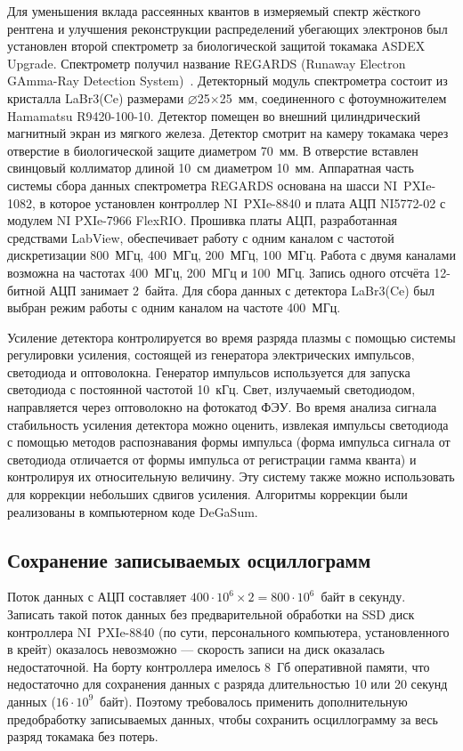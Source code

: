 Для уменьшения вклада рассеянных квантов в измеряемый спектр жёсткого рентгена и улучшения реконструкции распределений убегающих электронов был установлен второй спектрометр за биологической защитой токамака ASDEX Upgrade. Спектрометр получил название REGARDS (Runaway Electron GAmma-Ray Detection System)~\cite{DalMolin2019}. Детекторный модуль спектрометра состоит из кристалла LaBr3(Ce) размерами $\varnothing$25$\times$25~мм, соединенного с фотоумножителем Hamamatsu R9420-100-10. Детектор помещен во внешний цилиндрический магнитный экран из мягкого железа. Детектор смотрит на камеру токамака через отверстие в биологической защите диаметром 70~мм. В отверстие вставлен свинцовый коллиматор длиной 10~см диаметром 10~мм. Аппаратная часть системы сбора данных спектрометра REGARDS основана на шасси NI~PXIe-1082, в которое установлен контроллер NI~PXIe-8840 и плата АЦП NI5772-02 с модулем NI PXIe-7966 FlexRIO. Прошивка платы АЦП, разработанная средствами LabView, обеспечивает работу с одним каналом с частотой дискретизации 800~МГц, 400~МГц, 200~МГц, 100~МГц. Работа с двумя каналами возможна на частотах 400~МГц, 200~МГц и 100~МГц. Запись одного отсчёта 12-битной АЦП занимает 2~байта. Для сбора данных с детектора LaBr3(Ce) был выбран режим работы с одним каналом на частоте 400~МГц.~\cite{Shevelev2021}

Усиление детектора контролируется во время разряда плазмы с помощью системы регулировки усиления, состоящей из генератора электрических импульсов, светодиода и оптоволокна. Генератор импульсов используется для запуска светодиода с постоянной частотой 10~кГц. Свет, излучаемый светодиодом, направляется через оптоволокно на фотокатод ФЭУ. Во время анализа сигнала стабильность усиления детектора можно оценить, извлекая импульсы светодиода с помощью методов распознавания формы импульса (форма импульса сигнала от светодиода отличается от формы импульса от регистрации гамма кванта) и контролируя их относительную величину. Эту систему также можно использовать для коррекции небольших сдвигов усиления. Алгоритмы коррекции были реализованы в компьютерном коде DeGaSum.~\cite{Shevelev2021}


\subsection{Сохранение записываемых осциллограмм}

Поток данных с АЦП составляет $400 \cdot 10^6 \times 2 = 800 \cdot 10^6$~байт в секунду. Записать такой поток данных без предварительной обработки на SSD диск контроллера NI~PXIe-8840 (по сути, персонального компьютера, установленного в крейт) оказалось невозможно --- скорость записи на диск оказалась недостаточной. На борту контроллера имелось 8~Гб оперативной памяти, что недостаточно для сохранения данных с разряда длительностью 10 или 20 секунд данных ($16 \cdot 10^9$~байт). Поэтому требовалось применить дополнительную предобработку записываемых данных, чтобы сохранить осциллограмму за весь разряд токамака без потерь. 

